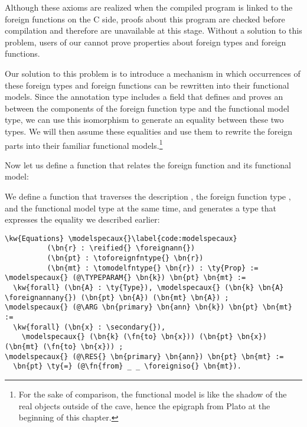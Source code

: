 Although these axioms are realized when the compiled program is linked to the foreign functions on the C side, proofs about this program are checked before compilation and therefore are unavailable at this stage.
Without a solution to this problem, users of our \FFI{} cannot prove properties about \gls{foreign type}s and \gls{foreign function}s.

Our solution to this problem is to introduce a mechanism in which occurrences of these \gls{foreign type}s and \gls{foreign function}s can be rewritten into their \gls{functional model}s. Since the annotation type \foreignann{} includes a field that defines and proves an \Isomorphism{} between the components of the \gls{foreign function} type and the \gls{functional model} type, we can use this isomorphism to generate an equality between these two types. We will then assume these equalities and use them to rewrite the foreign parts into their familiar \gls{functional model}s.\footnote{For the sake of comparison, the \gls{functional model} is like the shadow of the real objects outside of the cave, hence the epigraph from Plato at the beginning of this chapter.}

Now let us define a function that relates the \gls{foreign function} and its \gls{functional model}:

\newcommand{\modelspecaux}{\hyperref[code:modelspecaux]{\fn{model\_\linebreak[0]spec\_\linebreak[0]aux}}}
\newcommand{\modelspec}{\hyperref[code:modelspec]{\fn{model\_\linebreak[0]spec}}}

We define a function \modelspecaux{} that traverses the \reified{} description , the \gls{foreign function} type , and the \gls{functional model} type  at the same time, and generates a type that expresses the equality we described earlier:

\begin{Verbatim}
\kw{Equations} \modelspecaux{}\label{code:modelspecaux}
          (\bn{r} : \reified{} \foreignann{})
          (\bn{pt} : \toforeignfntype{} \bn{r})
          (\bn{mt} : \tomodelfntype{} \bn{r}) : \ty{Prop} :=
\modelspecaux{} (@\TYPEPARAM{} \bn{k}) \bn{pt} \bn{mt} :=
  \kw{forall} (\bn{A} : \ty{Type}), \modelspecaux{} (\bn{k} \bn{A} \foreignannany{}) (\bn{pt} \bn{A}) (\bn{mt} \bn{A}) ;
\modelspecaux{} (@\ARG \bn{primary} \bn{ann} \bn{k}) \bn{pt} \bn{mt} :=
  \kw{forall} (\bn{x} : \secondary{}),
    \modelspecaux{} (\bn{k} (\fn{to} \bn{x})) (\bn{pt} \bn{x}) (\bn{mt} (\fn{to} \bn{x})) ;
\modelspecaux{} (@\RES{} \bn{primary} \bn{ann}) \bn{pt} \bn{mt} :=
  \bn{pt} \ty{=} (@\fn{from} _ _ \foreigniso{} \bn{mt}).
\end{Verbatim}

